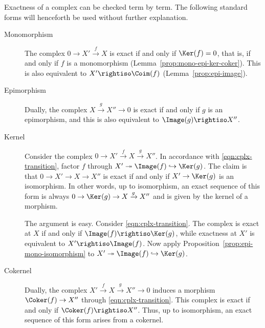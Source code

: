 Exactness of a complex can be checked term by term. The following standard
forms will henceforth be used without further explanation.

\begin{description}
	\item[Monomorphism] The complex $0\to X'\xrightarrow{f}X$ is exact if and
	only if $\Ker(f)=0$, that is, if and only if $f$ is a monomorphism
	(Lemma~\ref{prop:mono-epi-ker-coker}). This is also equivalent to
	$X'\rightiso\Coim(f)$ (Lemma~\ref{prop:epi-image}).

	\item[Epimorphism] Dually, the complex
	$X\xrightarrow{g}X''\to0$ is exact if and only if $g$ is an epimorphism,
	and this is also equivalent to $\Image(g)\rightiso X''$.

	\item[Kernel] Consider the complex
	$0\to X'\xrightarrow{f}X\xrightarrow{g}X''$. In accordance with
	\eqref{eqn:cplx-transition}, factor $f$ through
	$X'\twoheadrightarrow\Image(f)\hookrightarrow\Ker(g)$. The claim is that
	$0\to X'\to X\to X''$ is exact if and only if $X'\to\Ker(g)$ is an
	isomorphism. In other words, up to isomorphism, an exact sequence of this
	form is always $0\to\Ker(g)\to X\xrightarrow{g}X''$ and is given by the
	kernel of a morphism.

	The argument is easy. Consider \eqref{eqn:cplx-transition}. The complex is
	exact at $X$ if and only if $\Image(f)\rightiso\Ker(g)$, while exactness at
	$X'$ is equivalent to $X'\rightiso\Image(f)$. Now apply
	Proposition~\ref{prop:epi-mono-isomorphism} to
	$X'\twoheadrightarrow\Image(f)\hookrightarrow\Ker(g)$.

	\item[Cokernel] Dually, the complex
	$X'\xrightarrow{f}X\xrightarrow{g}X''\to0$ induces a morphism
	$\Coker(f)\to X''$ through \eqref{eqn:cplx-transition}. This complex is
	exact if and only if $\Coker(f)\rightiso X''$. Thus, up to isomorphism, an
	exact sequence of this form arises from a cokernel.


\end{description}
